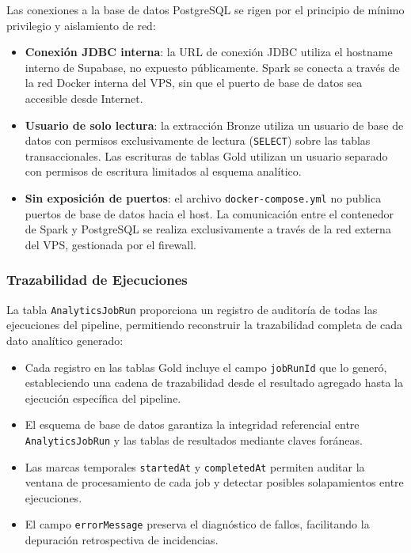 Las conexiones a la base de datos PostgreSQL se rigen por el principio
de mínimo privilegio y aislamiento de red:

\begin{itemize}[leftmargin=1.5em]
  \item \textbf{Conexión JDBC interna}: la URL de conexión JDBC utiliza
  el hostname interno de Supabase, no expuesto públicamente. Spark se
  conecta a través de la red Docker interna del VPS, sin que el puerto
  de base de datos sea accesible desde Internet.
  \item \textbf{Usuario de solo lectura}: la extracción Bronze utiliza
  un usuario de base de datos con permisos exclusivamente de lectura
  (\texttt{SELECT}) sobre las tablas transaccionales. Las escrituras de
  tablas Gold utilizan un usuario separado con permisos de escritura
  limitados al esquema analítico.
  \item \textbf{Sin exposición de puertos}: el archivo
  \texttt{docker-compose.yml} no publica puertos de base de datos hacia
  el host. La comunicación entre el contenedor de Spark y PostgreSQL se
  realiza exclusivamente a través de la red externa del VPS, gestionada
  por el firewall.
\end{itemize}

\subsubsection{Trazabilidad de Ejecuciones}

La tabla \texttt{AnalyticsJobRun} proporciona un registro de auditoría
de todas las ejecuciones del pipeline, permitiendo reconstruir la
trazabilidad completa de cada dato analítico generado:

\begin{itemize}[leftmargin=1.5em]
  \item Cada registro en las tablas Gold incluye el campo
  \texttt{jobRunId} que lo generó, estableciendo una cadena de
  trazabilidad desde el resultado agregado hasta la ejecución
  específica del pipeline.
  \item El esquema de base de datos garantiza la integridad referencial
  entre \texttt{AnalyticsJobRun} y las tablas de resultados mediante
  claves foráneas.
  \item Las marcas temporales \texttt{startedAt} y
  \texttt{completedAt} permiten auditar la ventana de procesamiento de
  cada job y detectar posibles solapamientos entre ejecuciones.
  \item El campo \texttt{errorMessage} preserva el diagnóstico de
  fallos, facilitando la depuración retrospectiva de incidencias.
\end{itemize}

